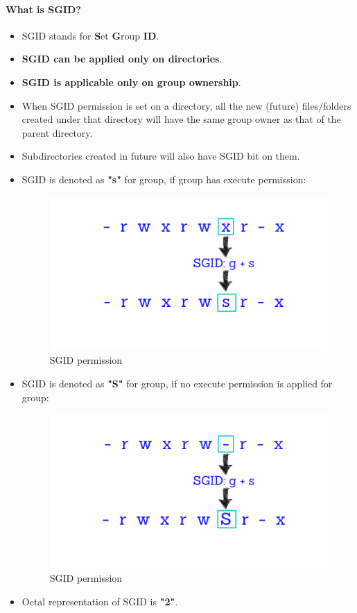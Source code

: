 \setlength{\columnsep}{3pt}
\begin{flushleft}
	\bigskip
	\paragraph{What is SGID?}
	\begin{itemize}
		\item SGID stands for \textbf{S}et \textbf{G}roup \textbf{ID}.
		\item \textbf{SGID can be applied only on directories}.
		\item \textbf{SGID is applicable only on group ownership}.
		\item When SGID permission is set on a directory, all the new (future) files/folders created
		under that directory will have the same group owner as that of the parent
		directory.
		\item Subdirectories created in future will also have SGID bit on them.
		\item SGID is denoted as \textbf{"s"} for group, if group has execute permission:
		\begin{figure}[h!]
			\centering
			\includegraphics[scale=0.3]{content/chapter6/images/adv_perm3.png}
			\caption{SGID permission}
			\label{fig:combination_permission5}
		\end{figure}
		\item SGID is denoted as \textbf{"S"} for group, if no execute permission is applied for group:
		\begin{figure}[h!]
			\centering
			\includegraphics[scale=0.3]{content/chapter6/images/adv_perm4.png}
			\caption{SGID permission}
			\label{fig:combination_permission6}
		\end{figure}
		\item Octal representation of SGID is \textbf{"2"}.
	\end{itemize}
	\newpage	

\end{flushleft}
